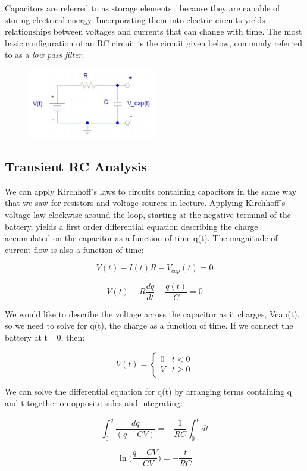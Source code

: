 \documentclass{article}
\begin{document}
Capacitors are referred to as storage elements , because they are capable of storing electrical energy. Incorporating them into electric circuits yields relationships between voltages and currents that can change with time. The most basic configuration of an RC circuit is the circuit given below, commonly referred to as a \textit{low pass filter}.

\begin{figure}[h]
    	\includegraphics[width=0.5\textwidth]{lab_1_fig_1.jpg}
    	\centering
		\end{figure}

\subsection*{Transient RC Analysis}
We can apply Kirchhoff’s laws to circuits containing capacitors in the same way that we saw for resistors and voltage sources in lecture. Applying Kirchhoff’s voltage law clockwise around the loop, starting at the negative terminal of the battery, yields a first order differential equation describing the charge accumulated on the capacitor as a function of time q(t). The magnitude of current flow is also a function of time:

$$V(t) - I(t)R - V_{cap}(t) = 0$$

$$V(t) - R\frac{dq}{dt} - \frac{q(t)}{C} = 0$$

We would like to describe the voltage across the capacitor as it charges, Vcap(t), so we need to solve for q(t), the charge as a function of time. If we connect the battery at t= 0, then:

$$V(t) = \begin{cases} 0 & t < 0 \\V & t \geq 0 \end{cases}$$

We can solve the differential equation for q(t) by arranging terms containing q and t together on opposite sides and integrating:

$$\int^q_0\frac{dq}{(q-CV)} = -\frac{1}{RC}\int^t_0 dt$$

$$\ln{\Big(\frac{q-CV}{-CV}\Big)} = -\frac{t}{RC}$$
\end{document}
